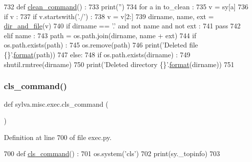 \begin{DoxyCode}
732 \textcolor{keyword}{def }\hyperlink{namespacesylva_1_1misc_1_1exec_a57af053cb45645bf285643c3a4f449f4}{clean\_command}() :
733   print(\textcolor{stringliteral}{''})
734   \textcolor{keywordflow}{for} a \textcolor{keywordflow}{in} to\_clean :
735     v = sy[a]
736     \textcolor{keywordflow}{if} v :
737       \textcolor{keywordflow}{if} v.startswith(\textcolor{stringliteral}{'./'}) :
738         v = v[2:]
739       dirname, name, ext = \hyperlink{namespacesylva_1_1misc_1_1util_a0ce6d1d719234031353b60ac60f2af0d}{dir\_and\_file}(v)
740       \textcolor{keywordflow}{if} dirname == \textcolor{stringliteral}{'.'} \textcolor{keywordflow}{and} \textcolor{keywordflow}{not} name \textcolor{keywordflow}{and} \textcolor{keywordflow}{not} ext :
741         \textcolor{keywordflow}{pass}
742       \textcolor{keywordflow}{elif} name :
743         path = os.path.join(dirname, name + ext)
744         \textcolor{keywordflow}{if} os.path.exists(path) :
745           os.remove(path)
746           print(\textcolor{stringliteral}{'Deleted file \{\}'}.\hyperlink{namespacesylva_1_1examples_1_1hsdfg_ab3510a0b8457362330aa4d9fd2209590}{format}(path))
747       \textcolor{keywordflow}{else}:
748         \textcolor{keywordflow}{if} os.path.exists(dirname) :
749           shutil.rmtree(dirname)
750           print(\textcolor{stringliteral}{'Deleted directory \{\}'}.\hyperlink{namespacesylva_1_1examples_1_1hsdfg_ab3510a0b8457362330aa4d9fd2209590}{format}(dirname))
751 
\end{DoxyCode}
\mbox{\label{namespacesylva_1_1misc_1_1exec_aef271c6d1dab8f9f3e66ab76cdecbf42}} 
\subsubsection{\texorpdfstring{cls\+\_\+command()}{cls\_command()}}
{\footnotesize\ttfamily def sylva.\+misc.\+exec.\+cls\+\_\+command (\begin{DoxyParamCaption}{ }\end{DoxyParamCaption})}



Definition at line 700 of file exec.\+py.


\begin{DoxyCode}
700 \textcolor{keyword}{def }\hyperlink{namespacesylva_1_1misc_1_1exec_aef271c6d1dab8f9f3e66ab76cdecbf42}{cls\_command}() :
701   os.system(\textcolor{stringliteral}{'cls'})
702   print(sy.\_topinfo)
703 
\end{DoxyCode}
\mbox{\label{namespacesylva_1_1misc_1_1exec_afdee869cb32b6c18b9747718ac8dc475}} 
